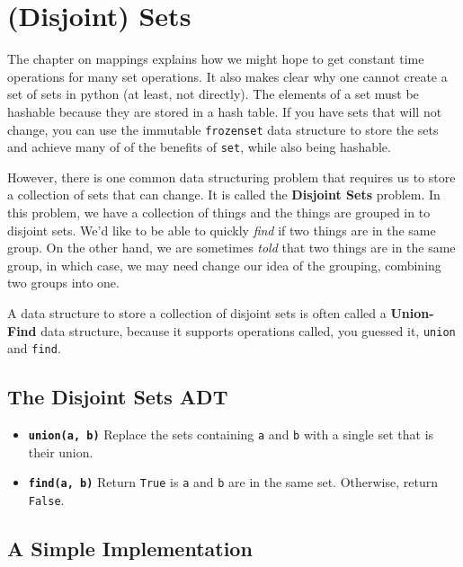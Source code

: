 \chapter{(Disjoint) Sets}


The chapter on mappings explains how we might hope to get constant time operations for many set operations.
It also makes clear why one cannot create a set of sets in python (at least, not directly).
The elements of a set must be hashable because they are stored in a hash table.
If you have sets that will not change, you can use the immutable \texttt{frozenset} data structure to store the sets and achieve many of of the benefits of \texttt{set}, while also being hashable.


However, there is one common data structuring problem that requires us to store a collection of sets that can change.
It is called the \textbf{Disjoint Sets} problem.
In this problem, we have a collection of things and the things are grouped in to disjoint sets.
We'd like to be able to quickly \emph{find} if two things are in the same group.
On the other hand, we are sometimes \emph{told} that two things are in the same group, in which case, we may need change our idea of the grouping, combining two groups into one.


A data structure to store a collection of disjoint sets is often called a \textbf{Union-Find} data structure, because it supports operations called, you guessed it, \texttt{union} and \texttt{find}.

\section{The Disjoint Sets ADT}

\begin{itemize}

\item 

\textbf{\texttt{union(a, b)}} Replace the sets containing \texttt{a} and \texttt{b} with a single set that is their union.



\item 

\textbf{\texttt{find(a, b)}} Return \texttt{True} is \texttt{a} and \texttt{b} are in the same set.  Otherwise, return \texttt{False}.



\end{itemize}
\section{A Simple Implementation}



